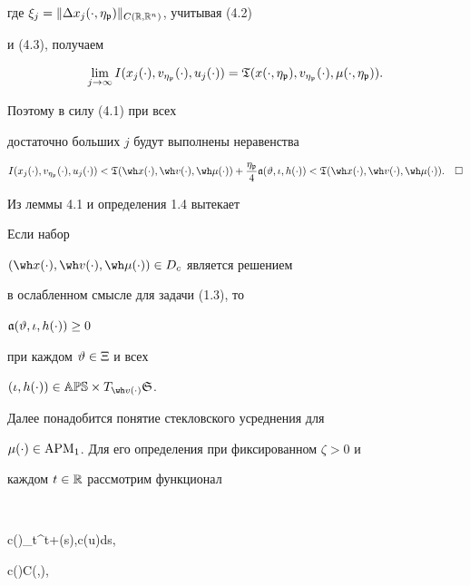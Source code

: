 где $\xi_{j}=\|\Delta x_j(\cdot,\eta_{\frak p})\|_{C(\Bbb R,\Bbb R^n)}$, учитывая (4.2)


и (4.3), получаем


$$


\lim_{j\to\infty}I(x_{j}(\cdot),v_{\eta_{\ggp}}(\cdot),u_{j}(\cdot))=


\gT(x(\cdot,\eta_{\ggp}),v_{\eta_{\ggp}}(\cdot),\mu(\cdot,\eta_{\ggp})).


$$


Поэтому в силу (4.1) при всех


достаточно больших $j$ будут выполнены неравенства


$$


I(x_{j}(\cdot),v_{\eta_{\ggp}}(\cdot),u_{j}(\cdot))<


\gT(\wh x(\cdot),\wh v(\cdot),\wh\mu(\cdot))


+\frac{\eta_{\ggp}}{4}\frak a(\vt,\iota,h(\cdot))<


\gT(\wh x(\cdot),\wh v(\cdot),\wh\mu(\cdot)).\quad\square


$$





Из леммы 4.1 и определения 1.4 вытекает





\begin{cors}


Если набор


$(\wh x(\cdot),\wh v(\cdot),\wh\mu(\cdot))\in D_{c}$ является решением


в ослабленном смысле для задачи (1.3), то


$\frak a(\vartheta,\iota,h(\cdot))\ge0$


при каждом $\vartheta\in\Xi$ и всех


$(\iota,h(\cdot))\in\Bbb{APS}\times T_{\wh v(\cdot)}\gS$.


\end{cors}





Далее понадобится понятие стекловского усреднения для


$\mu(\cdot)\in\operatorname{APM}_{1}$. Для его определения при фиксированном $\zeta>0$ и


каждом $t\in\Bbb R$ рассмотрим функционал


$$


c(\cdot)\mapsto{}\int_{t}^{t+\zeta}\la\mu(s),c(u)\ra ds,\ \


c(\cdot)\in C(\gU,\R),


